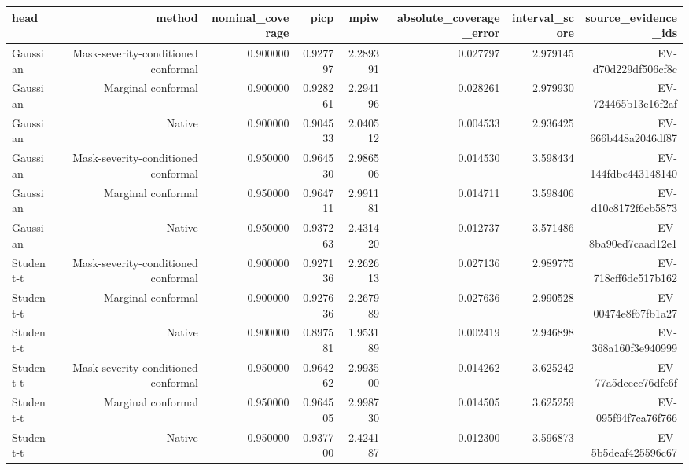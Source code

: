 \begin{tabular}{lrrrrrrr}
\hline
head & method & nominal\_coverage & picp & mpiw & absolute\_coverage\_error & interval\_score & source\_evidence\_ids \\
\hline
Gaussian & Mask-severity-conditioned conformal & 0.900000 & 0.927797 & 2.289391 & 0.027797 & 2.979145 & EV-d70d229df506cf8c \\
Gaussian & Marginal conformal & 0.900000 & 0.928261 & 2.294196 & 0.028261 & 2.979930 & EV-724465b13e16f2af \\
Gaussian & Native & 0.900000 & 0.904533 & 2.040512 & 0.004533 & 2.936425 & EV-666b448a2046df87 \\
Gaussian & Mask-severity-conditioned conformal & 0.950000 & 0.964530 & 2.986506 & 0.014530 & 3.598434 & EV-144fdbc443148140 \\
Gaussian & Marginal conformal & 0.950000 & 0.964711 & 2.991181 & 0.014711 & 3.598406 & EV-d10c8172f6cb5873 \\
Gaussian & Native & 0.950000 & 0.937263 & 2.431420 & 0.012737 & 3.571486 & EV-8ba90ed7caad12e1 \\
Student-t & Mask-severity-conditioned conformal & 0.900000 & 0.927136 & 2.262613 & 0.027136 & 2.989775 & EV-718cff6dc517b162 \\
Student-t & Marginal conformal & 0.900000 & 0.927636 & 2.267989 & 0.027636 & 2.990528 & EV-00474e8f67fb1a27 \\
Student-t & Native & 0.900000 & 0.897581 & 1.953189 & 0.002419 & 2.946898 & EV-368a160f3e940999 \\
Student-t & Mask-severity-conditioned conformal & 0.950000 & 0.964262 & 2.993500 & 0.014262 & 3.625242 & EV-77a5dcecc76dfe6f \\
Student-t & Marginal conformal & 0.950000 & 0.964505 & 2.998730 & 0.014505 & 3.625259 & EV-095f64f7ca76f766 \\
Student-t & Native & 0.950000 & 0.937700 & 2.424187 & 0.012300 & 3.596873 & EV-5b5deaf425596c67 \\
\hline
\end{tabular}
